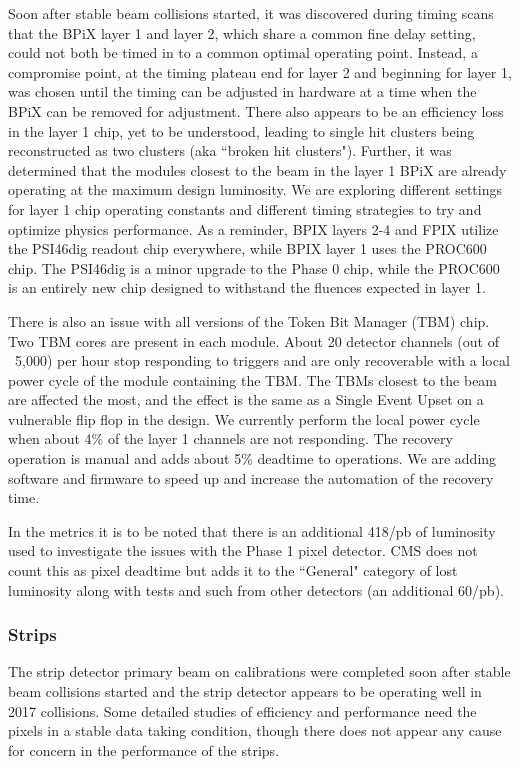 Soon after stable beam collisions started, it was discovered during timing scans that the BPiX layer 1 and layer 2, which share a common fine delay setting, could not both be timed in to a common optimal operating point. Instead, a compromise point, at the timing plateau end for layer 2 and beginning for layer 1, was chosen until the timing can be adjusted in hardware at a time when the BPiX can be removed for adjustment. There also appears to be an efficiency loss in the layer 1 chip, yet to be understood, leading to single hit clusters being reconstructed as two clusters (aka ``broken hit clusters"). Further, it was determined that the modules closest to the beam in the layer 1 BPiX are already operating at the maximum design luminosity. We are exploring different settings for layer 1 chip operating constants and different timing strategies to try and optimize physics performance. As a reminder, BPIX layers 2-4 and FPIX utilize the PSI46dig readout chip everywhere, while BPIX layer 1 uses the PROC600 chip.  The PSI46dig is a minor upgrade to the Phase 0 chip, while the PROC600 is an entirely new chip designed to withstand the fluences expected in layer 1.

There is also an issue with all versions of the Token Bit Manager (TBM) chip. Two TBM cores are present in each module.  About 20 detector channels (out of ~5,000) per hour stop responding to triggers and are only recoverable with a local power cycle of the module containing the TBM. The TBMs closest to the beam are affected the most, and the effect is the same as a Single Event Upset on a vulnerable flip flop in the design. We currently perform the local power cycle when about 4\% of the layer 1 channels are not responding. The recovery operation is manual and adds about 5\% deadtime to operations. We are adding software and firmware to speed up and increase the automation of the recovery time.

In the metrics it is to be noted that there is an additional 418/pb of luminosity used to investigate the issues with the Phase 1 pixel detector. CMS does not count this as pixel deadtime but adds it to the ``General" category of lost luminosity along with tests and such from
other detectors (an additional 60/pb).

\subsubsection{Strips}

The strip detector primary beam on calibrations were completed soon after stable beam collisions started and the strip detector appears to be operating well in 2017 collisions. Some detailed studies of efficiency and performance need the pixels in a stable data taking condition, though there does not appear any cause for concern in the performance of the strips.

